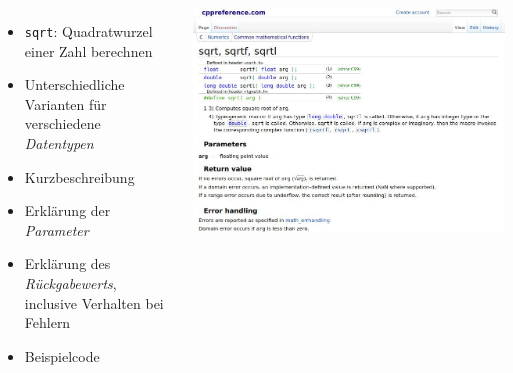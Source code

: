 
\begin{frame}
%
\begin{columns}%
\begin{itemize}
\item \texttt{sqrt}: Quadratwurzel einer Zahl berechnen
\item Unterschiedliche Varianten für verschiedene \emph{Datentypen}
\item Kurzbeschreibung
\item Erklärung der \emph{Parameter}
\item Erklärung des \emph{Rückgabewerts}, inclusive Verhalten bei Fehlern
\item Beispielcode
\end{itemize}
%
\includegraphics[width=\linewidth]{./gfx/cpp-sqrt}
\end{columns}
%
\end{frame}